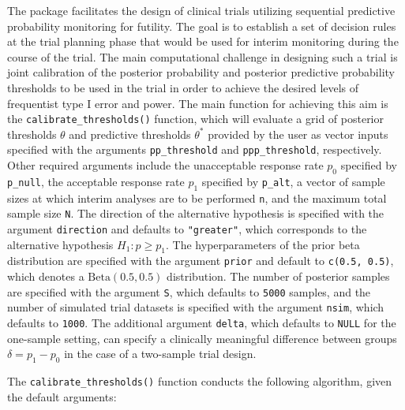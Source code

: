 The  package facilitates the design of clinical trials
utilizing sequential predictive probability monitoring for futility. The
goal is to establish a set of decision rules at the trial planning phase
that would be used for interim monitoring during the course of the
trial. The main computational challenge in designing such a trial is
joint calibration of the posterior probability and posterior predictive
probability thresholds to be used in the trial in order to achieve the
desired levels of frequentist type I error and power. The main function
for achieving this aim is the \texttt{calibrate\_thresholds()} function,
which will evaluate a grid of posterior thresholds \(\theta\) and
predictive thresholds \(\theta^*\) provided by the user as vector inputs
specified with the arguments \texttt{pp\_threshold} and
\texttt{ppp\_threshold}, respectively. Other required arguments include
the unacceptable response rate \(p_0\) specified by \texttt{p\_null},
the acceptable response rate \(p_1\) specified by \texttt{p\_alt}, a
vector of sample sizes at which interim analyses are to be performed
\texttt{n}, and the maximum total sample size \texttt{N}. The direction
of the alternative hypothesis is specified with the argument
\texttt{direction} and defaults to \texttt{"greater"}, which corresponds
to the alternative hypothesis \(H_1: p \geq p_1\). The hyperparameters
of the prior beta distribution are specified with the argument
\texttt{prior} and default to \texttt{c(0.5,\ 0.5)}, which denotes a
\(\mbox{Beta}(0.5, 0.5)\) distribution. The number of posterior samples
are specified with the argument \texttt{S}, which defaults to
\texttt{5000} samples, and the number of simulated trial datasets is
specified with the argument \texttt{nsim}, which defaults to
\texttt{1000}. The additional argument \texttt{delta}, which defaults to
\texttt{NULL} for the one-sample setting, can specify a clinically
meaningful difference between groups \(\delta = p_1 - p_0\) in the case
of a two-sample trial design.

The \texttt{calibrate\_thresholds()} function conducts the following
algorithm, given the default arguments:

